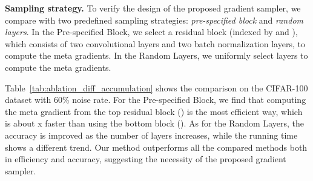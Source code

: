 \documentclass[final]{cvpr}
\begin{document}
\textbf{Sampling strategy.} To verify the design of the proposed gradient sampler, we compare with two predefined sampling strategies: \textit{pre-specified block} and \textit{random layers}. In the Pre-specified Block, we select a residual block (indexed by  and ), which consists of two convolutional layers and two batch normalization layers, to compute the meta gradients. In the Random Layers, we uniformly select  layers to compute the meta gradients.

Table~\ref{tab:ablation_diff_accumulation} shows the comparison on the CIFAR-100 dataset with 60\% noise rate. For the Pre-specified Block, we find that computing the meta gradient from the top residual block () is the most efficient way, which is about x faster than using the bottom block (). 
As for the Random Layers, the accuracy is improved as the number of layers  increases, while the running time shows a different trend.
Our method outperforms all the compared methods both in efficiency and accuracy, suggesting the necessity of the proposed gradient sampler. 
\end{document}
